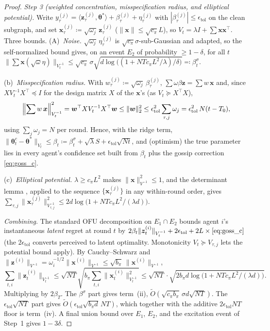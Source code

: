 \documentclass[11pt]{article}
\newcommand{\Ot}{\widetilde{O}}
\begin{document}
\begin{proof}
\emph{Step 3 (weighted concentration, misspecification radius, and
elliptical potential).}
Write $y_\tau^{(j)}=\langle\bm z_\tau^{(j)},\bm\theta^{\!*}\rangle
+\beta_\tau^{(j)}+\eta_\tau^{(j)}$ with
$|\beta_\tau^{(j)}|\leq\epsilon_{\mathrm{tol}}$ on the clean subgraph,
and set $\bm x_\tau^{(j)}\coloneqq\sqrt{\omega_j}\,\bm z_\tau^{(j)}$
($\|\bm x\|\leq\sqrt{c_\pi}L$), so
$V_t=\lambda I+\sum\bm x\bm x^\top$.  Three bounds. (A)~\emph{Noise.}  $\sqrt{\omega_j}\,\eta_\tau^{(j)}$ is
$\sqrt{c_\pi}\sigma$-sub-Gaussian and adapted, so the self-normalized
bound \citep[Thm.~1]{abbasi2011} gives, on an event $E_2$ of
probability $\geq1-\delta$, for all $t$ $\|\sum\bm x(\sqrt{\omega}\eta)\|_{V_t^{-1}}
\leq\sqrt{c_\pi}\,\sigma\sqrt{d\log\bigl((1+NTc_\pi L^2/\lambda)/\delta\bigr)}
\eqqcolon\beta_t^{\sigma}$.

(b)~\emph{Misspecification radius.}  With
$w_\tau^{(j)}\coloneqq\sqrt{\omega_j}\,\beta_\tau^{(j)}$,
$\sum\omega\beta\bm z=\sum w\,\bm x$ and, since
$X V_t^{-1}X^\top\preceq I$ for the design matrix $X$ of the
$\bm x$'s (as $V_t\succeq X^\top X$),
\[
\Bigl\|\sum w\,\bm x\Bigr\|_{V_t^{-1}}^2
=\bm w^\top XV_t^{-1}X^\top\bm w
\leq\|\bm w\|_2^2
\leq\epsilon_{\mathrm{tol}}^2\sum_{\tau,j}\omega_j
=\epsilon_{\mathrm{tol}}^2\,N(t-T_0),
\]
using $\sum_j\omega_j=N$ per round.  Hence, with the ridge term,
$\|\bm\theta_t^{c}-\bm\theta^{\!*}\|_{V_t}\leq
\beta_t\coloneqq\beta_t^{\sigma}+\sqrt\lambda S
+\epsilon_{\mathrm{tol}}\sqrt{Nt}$, and (optimism) the true parameter
lies in every agent's confidence set built from $\beta_t$ plus the
gossip correction \eqref{eq:goss_c}.

(c)~\emph{Elliptical potential.}  $\lambda\geq c_\pi L^2$ makes
$\|\bm x\|_{V^{-1}}^2\leq1$, and the determinant lemma
\citep[Lem.~11]{abbasi2011}, applied to the sequence
$\{\bm x_\tau^{(j)}\}$ in any within-round order, gives
$\sum_{\tau,j}\|\bm x_\tau^{(j)}\|^2_{V_{\tau,j}^{-1}}
\leq 2d\log\bigl(1+NTc_\pi L^2/(\lambda d)\bigr)$.

\emph{Combining.}  The standard OFU decomposition on
$E_1\cap E_2$ bounds agent $i$'s instantaneous \emph{latent} regret at
round $t$ by
$2\beta_t\|\bm z_t^{(i)}\|_{V_t^{-1}}+2\epsilon_{\mathrm{tol}}
+2L\times\eqref{eq:goss_c}$
(the $2\epsilon_{\mathrm{tol}}$ converts perceived to latent
optimality. Monotonicity $V_{t}\succeq V_{\tau,j}$ lets the potential
bound apply).  By Cauchy--Schwarz and
$\|\bm z^{(i)}\|_{V^{-1}}=\omega_i^{-1/2}\|\bm x^{(i)}\|_{V^{-1}}
\leq\sqrt{b_\pi}\,\|\bm x^{(i)}\|_{V^{-1}}$,
\[
\sum_{t,i}\|\bm z_t^{(i)}\|_{V_t^{-1}}
\leq\sqrt{NT}\sqrt{b_\pi\sum_{t,i}\|\bm x_t^{(i)}\|^2_{V_t^{-1}}}
\leq\sqrt{NT}\cdot\sqrt{2b_\pi d\log\bigl(1+NTc_\pi L^2/(\lambda d)\bigr)} .
\]
Multiplying by $2\beta_T$. The $\beta^\sigma$ part gives term~(ii),
$\Ot(\sqrt{c_\pi b_\pi}\,\sigma d\sqrt{NT})$. The
$\epsilon_{\mathrm{tol}}\sqrt{NT}$ part gives
$\Ot(\epsilon_{\mathrm{tol}}\sqrt{b_\pi d}\,NT)$, which together with
the additive $2\epsilon_{\mathrm{tol}}NT$ floor is term~(iv).  A final
union bound over $E_1$, $E_2$, and the excitation event of Step~1
gives $1-3\delta$.
\end{proof}
\end{document}
